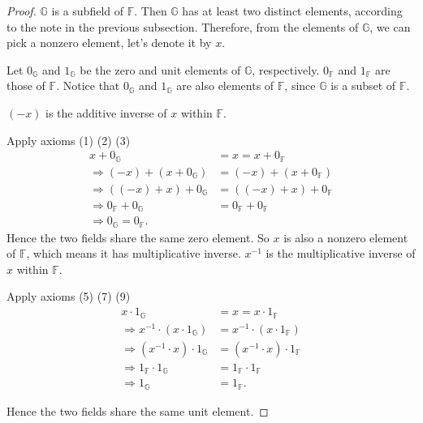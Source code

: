 \begin{proof}
    $\mathbb{G}$ is a subfield of $\mathbb{F}$. Then $\mathbb{G}$ has at least two distinct elements, according to the note in the previous subsection. Therefore, from the elements of $\mathbb{G}$, we can pick a nonzero element, let's denote it by $x$.

    Let $0_{\mathbb{G}}$ and $1_{\mathbb{G}}$ be the zero and unit elements of $\mathbb{G}$, respectively. $0_{\mathbb{F}}$ and $1_{\mathbb{F}}$ are those of $\mathbb{F}$. Notice that $0_{\mathbb{G}}$ and $1_{\mathbb{G}}$ are also elements of $\mathbb{F}$, since $\mathbb{G}$ is a subset of $\mathbb{F}$.

    $(-x)$ is the additive inverse of $x$ within $\mathbb{F}$.

    Apply axioms (1) (2) (3)
    \begin{align*}
        x + 0_{\mathbb{G}}                          & = x = x + 0_{\mathbb{F}}          \\
        \Rightarrow (-x) + (x + 0_{\mathbb{G}})     & = (-x) + (x + 0_{\mathbb{F}})     \\
        \Rightarrow ((-x) + x) + 0_{\mathbb{G}}     & = ((-x) + x) + 0_{\mathbb{F}}     \\
        \Rightarrow 0_{\mathbb{F}} + 0_{\mathbb{G}} & = 0_{\mathbb{F}} + 0_{\mathbb{F}} \\
        \Rightarrow 0_{\mathbb{G}} = 0_{\mathbb{F}}.
    \end{align*}
    Hence the two fields share the same zero element. So $x$ is also a nonzero element of $\mathbb{F}$, which means it has multiplicative inverse. $x^{-1}$ is the multiplicative inverse of $x$ within $\mathbb{F}$.

    Apply axioms (5) (7) (9)
    \begin{align*}
        x\cdot 1_{\mathbb{G}}                           & = x = x\cdot 1_{\mathbb{F}}           \\
        \Rightarrow x^{-1}\cdot (x\cdot 1_{\mathbb{G}}) & = x^{-1}\cdot (x\cdot 1_{\mathbb{F}}) \\
        \Rightarrow (x^{-1}\cdot x)\cdot 1_{\mathbb{G}} & = (x^{-1}\cdot x)\cdot 1_{\mathbb{F}} \\
        \Rightarrow 1_{\mathbb{F}}\cdot 1_{\mathbb{G}}  & = 1_{\mathbb{F}}\cdot 1_{\mathbb{F}}  \\
        \Rightarrow 1_{\mathbb{G}}                      & = 1_{\mathbb{F}}.
    \end{align*}

    Hence the two fields share the same unit element.
\end{proof}

